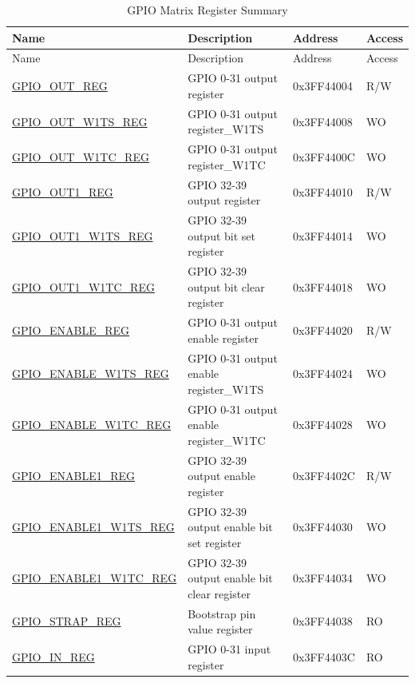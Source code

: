 \begin{longtable}{ | p{5.6cm} | p{7.4cm} | p{2cm} | p{1cm} | }
\caption{GPIO Matrix Register Summary} 
\\\hline\rowcolor{lightgray}
Name & Description &  Address & Access \\ \hline
\endfirsthead
\hline\rowcolor{lightgray}
Name & Description &  Address & Access \\ \hline
\endhead
\endfoot
\hyperref[regdesc:GPIOOUTREG]{GPIO\_OUT\_REG} & GPIO 0-31 output register & 0x3FF44004 & R/W \\ \hline
\hyperref[regdesc:GPIOOUTW1TSREG]{GPIO\_OUT\_W1TS\_REG} & GPIO 0-31 output register\_W1TS & 0x3FF44008 & WO \\ \hline
\hyperref[regdesc:GPIOOUTW1TCREG]{GPIO\_OUT\_W1TC\_REG} & GPIO 0-31 output register\_W1TC & 0x3FF4400C & WO \\ \hline
\hyperref[regdesc:GPIOOUT1REG]{GPIO\_OUT1\_REG} & GPIO 32-39 output register & 0x3FF44010 & R/W \\ \hline
\hyperref[regdesc:GPIOOUT1W1TSREG]{GPIO\_OUT1\_W1TS\_REG} & GPIO 32-39 output bit set register & 0x3FF44014 & WO \\ \hline
\hyperref[regdesc:GPIOOUT1W1TCREG]{GPIO\_OUT1\_W1TC\_REG} & GPIO 32-39 output bit clear register & 0x3FF44018 & WO \\ \hline
\hyperref[regdesc:GPIOENABLEREG]{GPIO\_ENABLE\_REG} & GPIO 0-31 output enable register & 0x3FF44020 & R/W \\ \hline
\hyperref[regdesc:GPIOENABLEW1TSREG]{GPIO\_ENABLE\_W1TS\_REG} & GPIO 0-31 output enable register\_W1TS & 0x3FF44024 & WO \\ \hline
\hyperref[regdesc:GPIOENABLEW1TCREG]{GPIO\_ENABLE\_W1TC\_REG} & GPIO 0-31 output enable register\_W1TC & 0x3FF44028 & WO \\ \hline
\hyperref[regdesc:GPIOENABLE1REG]{GPIO\_ENABLE1\_REG} & GPIO 32-39 output enable register & 0x3FF4402C & R/W \\ \hline
\hyperref[regdesc:GPIOENABLE1W1TSREG]{GPIO\_ENABLE1\_W1TS\_REG} & GPIO 32-39 output enable bit set register & 0x3FF44030 & WO \\ \hline
\hyperref[regdesc:GPIOENABLE1W1TCREG]{GPIO\_ENABLE1\_W1TC\_REG} & GPIO 32-39 output enable bit clear register & 0x3FF44034 & WO \\ \hline
\hyperref[regdesc:GPIOSTRAPREG]{GPIO\_STRAP\_REG} & Bootstrap pin value register & 0x3FF44038 & RO \\ \hline
\hyperref[regdesc:GPIOINREG]{GPIO\_IN\_REG} & GPIO 0-31 input register & 0x3FF4403C & RO \\ \hline

\end{longtable}
